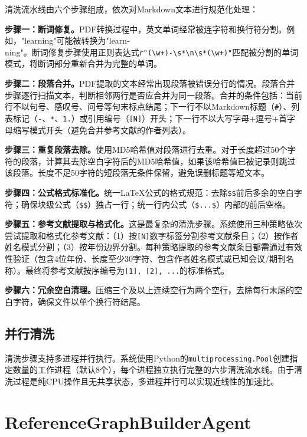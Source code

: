 清洗流水线由六个步骤组成，依次对Markdown文本进行规范化处理：

\textbf{步骤一：断词修复。}PDF转换过程中，英文单词经常被连字符和换行符分割。例如，"learning"可能被转换为"learn-\\ning"。断词修复步骤使用正则表达式\texttt{r"(\textbackslash w+)-\textbackslash s*\textbackslash n\textbackslash s*(\textbackslash w+)"}匹配被分割的单词模式，将断词部分重新合并为完整的单词。

\textbf{步骤二：段落合并。}PDF提取的文本经常出现段落被错误分行的情况。段落合并步骤逐行扫描文本，判断相邻两行是否应合并为同一段落。合并的条件包括：当前行不以句号、感叹号、问号等句末标点结尾；下一行不以Markdown标题（\texttt{\#}）、列表标记（\texttt{-}、\texttt{*}、\texttt{1.}）或引用编号（\texttt{[N]}）开头；下一行不以大写字母+逗号+首字母缩写模式开头（避免合并参考文献的作者列表）。

\textbf{步骤三：重复段落去除。}使用MD5哈希值对段落进行去重。对于长度超过50个字符的段落，计算其去除空白字符后的MD5哈希值，如果该哈希值已被记录则跳过该段落。长度不足50字符的短段落无条件保留，避免误删标题等短文本。

\textbf{步骤四：公式格式标准化。}统一LaTeX公式的格式规范：去除\texttt{\$\$}前后多余的空白字符；确保块级公式（\texttt{\$\$}）独占一行；统一行内公式（\texttt{\$...\$}）内部的前后空格。

\textbf{步骤五：参考文献提取与格式化。}这是最复杂的清洗步骤。系统使用三种策略依次尝试提取和格式化参考文献：（1）按\texttt{[N]}数字标签分割参考文献条目；（2）按作者姓名模式分割；（3）按年份边界分割。每种策略提取的参考文献条目都需通过有效性验证（包含4位年份、长度至少30字符、包含作者姓名模式或已知会议/期刊名称）。最终将参考文献按序编号为\texttt{[1], [2], ...}的标准格式。

\textbf{步骤六：冗余空白清理。}压缩三个及以上连续空行为两个空行，去除每行末尾的空白字符，确保文件以单个换行符结尾。

\subsection{并行清洗}

清洗步骤支持多进程并行执行。系统使用Python的\texttt{multiprocessing.Pool}创建指定数量的工作进程（默认8个），每个进程独立执行完整的六步清洗流水线。由于清洗过程是纯CPU操作且无共享状态，多进程并行可以实现近线性的加速比。

\section{ReferenceGraphBuilderAgent}

